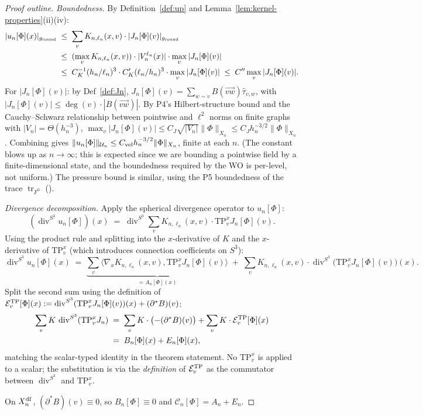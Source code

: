 \documentclass[11pt, a4paper]{amsart}
\theoremstyle{definition}
\newcommand{\tr}{\operatorname{tr}}
\newcommand{\divS}{\operatorname{div}^{S^3}}
\begin{document}
\begin{proof}[Proof outline]
\emph{Boundedness.} By Definition~\ref{def:up} and
Lemma~\ref{lem:kernel-properties}(ii)(iv):
\begin{align*}
  |u_n[\Phi](x)|_{g_{\rm round}}
    &\;\leq\; \sum_v K_{n, \ell_n}(x, v) \cdot
       |J_n[\Phi](v)|_{g_{\rm round}} \\
    &\;\leq\; (\max_v K_{n, \ell_n}(x, v)) \cdot
       |V_n^{\ell_n}(x)| \cdot \max_v |J_n[\Phi](v)| \\
    &\;\leq\; C_K^{-1}(h_n/\ell_n)^3 \cdot C_K'(\ell_n/h_n)^3
       \cdot \max_v |J_n[\Phi](v)|
    \;\leq\; C'' \max_v |J_n[\Phi](v)|.
\end{align*}
For $|J_n[\Phi](v)|$: by Def~\ref{def:Jn}, $J_n[\Phi](v) =
\sum_{w \sim v} B(\vec{vw}) \hat\tau_{v,w}$, with $|J_n[\Phi](v)|
\leq \deg(v) \cdot |B(\vec{vw})|$. By P4's Hilbert-structure
bound \cite[Prop.~2.2]{ClosureDynamics} and the Cauchy--Schwarz
relationship between pointwise and $\ell^2$ norms on finite
graphs with $|V_n| = \Theta(h_n^{-3})$, $\max_v |J_n[\Phi](v)|
\leq C_J \sqrt{|V_n|} \|\Phi\|_{X_n} \leq C_J h_n^{-3/2}
\|\Phi\|_{X_n}$. Combining gives
$\|u_n[\Phi]\|_{\mathcal U_n} \leq C_{\rm vel} h_n^{-3/2}
\|\Phi\|_{X_n}$, finite at each $n$. (The constant blows up as
$n \to \infty$; this is expected since we are bounding a
pointwise field by a finite-dimensional state, and the
boundedness required by the WO is per-level, not uniform.)
The pressure bound is similar, using the P5 boundedness of
the trace $\tr_{F^0}$ (\cite[Prop.~3.3]{MetricProjection}).

\emph{Divergence decomposition.} Apply the spherical divergence
operator to $u_n[\Phi]$:
\[
  (\divS u_n[\Phi])(x)
    \;=\; \divS \sum_v K_{n,\ell_n}(x, v) \cdot \mathrm{TP}_v^x
    J_n[\Phi](v).
\]
Using the product rule and splitting into the $x$-derivative of
$K$ and the $x$-derivative of $\mathrm{TP}_v^x$ (which introduces
connection coefficients on $S^3$):
\[
  \divS u_n[\Phi](x) \;=\;
    \underbrace{\sum_v \bigl\langle \nabla_x K_{n, \ell_n}(x, v),
       \mathrm{TP}_v^x J_n[\Phi](v)\bigr\rangle}_{= A_n[\Phi](x)}
    \;+\; \sum_v K_{n, \ell_n}(x, v) \cdot
    \divS\bigl(\mathrm{TP}_v^x J_n[\Phi](v)\bigr)(x).
\]
Split the second sum using the definition of
$\mathcal E^{\rm TP}_v[\Phi](x) :=
\divS(\mathrm{TP}_v^x J_n[\Phi](v))(x) + (\partial^\ast B)(v)$:
\begin{align*}
  \sum_v K\,\divS(\mathrm{TP}_v^x J_n)
    &\;=\; \sum_v K \cdot\bigl(-(\partial^\ast B)(v)\bigr)
       + \sum_v K\cdot\mathcal E^{\rm TP}_v[\Phi](x) \\
    &\;=\; B_n[\Phi](x) + E_n[\Phi](x),
\end{align*}
matching the scalar-typed identity in the theorem statement.
No $\mathrm{TP}_v^x$ is applied to a scalar; the substitution
is via the \emph{definition} of $\mathcal E^{\rm TP}_v$ as the
commutator between $\divS$ and $\mathrm{TP}_v^x$.

On $X_n^{\rm df}$, $(\partial^\ast B)(v) \equiv 0$, so
$B_n[\Phi] \equiv 0$ and $\mathcal C_n[\Phi] = A_n + E_n$.
\end{proof}
\end{document}
